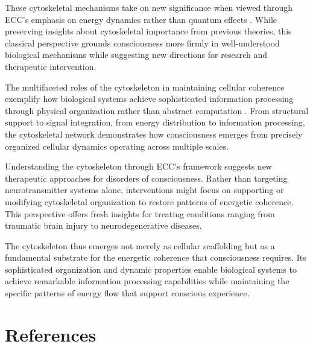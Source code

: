 \begin{refsection}
These cytoskeletal mechanisms take on new significance when viewed through ECC's emphasis on energy dynamics rather than quantum effects \cite{Baas2011}. While preserving insights about cytoskeletal importance from previous theories, this classical perspective grounds consciousness more firmly in well-understood biological mechanisms while suggesting new directions for research and therapeutic intervention.

The multifaceted roles of the cytoskeleton in maintaining cellular coherence exemplify how biological systems achieve sophisticated information processing through physical organization rather than abstract computation \cite{Fletcher2010}. From structural support to signal integration, from energy distribution to information processing, the cytoskeletal network demonstrates how consciousness emerges from precisely organized cellular dynamics operating across multiple scales.

Understanding the cytoskeleton through ECC's framework suggests new therapeutic approaches for disorders of consciousness. Rather than targeting neurotransmitter systems alone, interventions might focus on supporting or modifying cytoskeletal organization to restore patterns of energetic coherence. This perspective offers fresh insights for treating conditions ranging from traumatic brain injury to neurodegenerative diseases.

The cytoskeleton thus emerges not merely as cellular scaffolding but as a fundamental substrate for the energetic coherence that consciousness requires. Its sophisticated organization and dynamic properties enable biological systems to achieve remarkable information processing capabilities while maintaining the specific patterns of energy flow that support conscious experience.

\newpage
\section{References}
\printbibliography[title={},heading=subbibliography]
\end{refsection}